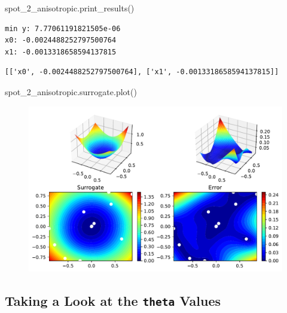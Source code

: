 \documentclass[
  letterpaper,
  DIV=11,
  numbers=noendperiod]{scrreprt}
\newenvironment{Shaded}{\begin{snugshade}}{\end{snugshade}}
\newcommand{\NormalTok}[1]{\textcolor[rgb]{0.00,0.23,0.31}{#1}}
\begin{document}
\begin{Shaded}
\begin{Highlighting}[]
\NormalTok{spot\_2\_anisotropic.print\_results()}
\end{Highlighting}
\end{Shaded}

\begin{verbatim}
min y: 7.77061191821505e-06
x0: -0.0024488252797500764
x1: -0.0013318658594137815
\end{verbatim}

\begin{verbatim}
[['x0', -0.0024488252797500764], ['x1', -0.0013318658594137815]]
\end{verbatim}

\begin{Shaded}
\begin{Highlighting}[]
\NormalTok{spot\_2\_anisotropic.surrogate.plot()}
\end{Highlighting}
\end{Shaded}

\begin{figure}[H]

{\centering \includegraphics{03_spot_anisotropic_files/figure-pdf/cell-11-output-1.pdf}

}

\end{figure}

\hypertarget{taking-a-look-at-the-theta-values}{%
\subsection{\texorpdfstring{Taking a Look at the \texttt{theta}
Values}{Taking a Look at the theta Values}}\label{taking-a-look-at-the-theta-values}}
\end{document}
